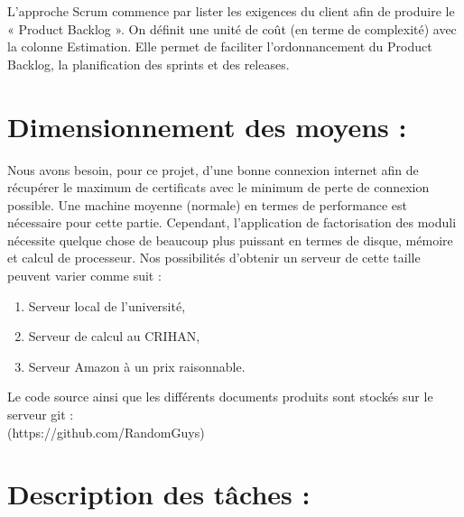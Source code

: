 \documentclass[a4paper,11pt,french]{article}
\begin{document}
L'approche Scrum commence par lister les exigences du client afin de produire le « Product Backlog ». On définit une unité de coût (en terme de complexité) avec la colonne Estimation. Elle permet de faciliter l'ordonnancement du Product Backlog, la planification des sprints et des releases.


\section{Dimensionnement des moyens :}

Nous avons besoin, pour ce projet, d'une bonne connexion internet afin de récupérer le maximum de certificats avec le minimum de perte de connexion possible. Une machine moyenne (normale) en termes de performance est nécessaire pour cette partie. Cependant, l'application de factorisation des moduli nécessite quelque chose de beaucoup plus puissant en termes de disque, mémoire et calcul de processeur. Nos possibilités d'obtenir un serveur de cette taille peuvent varier comme suit :
\begin{enumerate}
\item Serveur local de l'université,
\item Serveur de calcul au CRIHAN,
\item Serveur Amazon à un prix raisonnable.
\end{enumerate}

Le code source ainsi que les différents documents produits sont stockés sur le serveur git : \\ (https://github.com/RandomGuys)

\newpage

\section{Description des tâches :}
\end{document}
